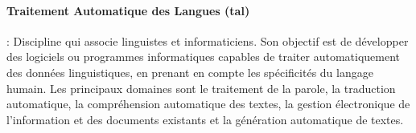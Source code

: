 \paragraph{Traitement Automatique des Langues (\acrshort{tal})}: Discipline qui associe linguistes et informaticiens. Son objectif est de développer des logiciels ou programmes informatiques capables de traiter automatiquement des données linguistiques, en prenant en compte les spécificités du langage humain. Les principaux domaines sont le traitement de la parole, la traduction automatique, la compréhension automatique des textes, la gestion électronique de l'information et des documents existants et la génération automatique de textes.